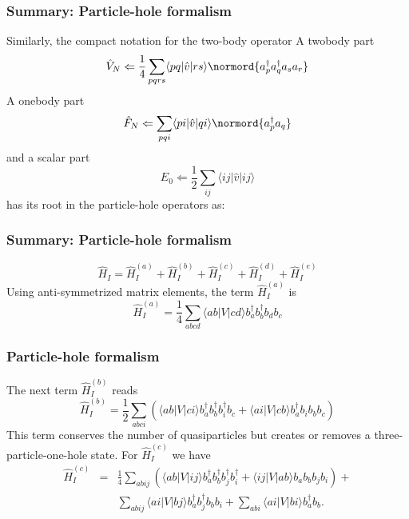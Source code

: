 \documentclass[compress]{beamer}
\newcommand*{\ket}[1]{|#1\rangle}
\newcommand*{\bra}[1]{\langle#1|}
\newcommand{\element}[3]
        {\bra{#1}#2\ket{#3}}
\begin{document}
\frame
{
  \frametitle{Summary: Particle-hole formalism}
\begin{small}
{\scriptsize
Similarly, the compact notation for the  two-body operator
    A twobody part
    \begin{equation*}
            \hat{V}_N \Leftarrow \frac{1}{4} \sum_{pqrs} \element{pq}{\hat{v}}{rs} 
                \normord{a^\dagger_p a^\dagger_q a_s  a_r}
    \end{equation*}
    A onebody part
    \begin{equation*}
            \hat{F}_N \Leftarrow \sum_{pqi} \element{pi}{\hat{v}}{qi} \normord{a^\dagger_p a_q}
    \end{equation*}
    and a scalar part
    \begin{equation*}
                E_0 \Leftarrow \frac{1}{2} \sum_{ij} \element{ij}{\hat{v}}{ij}
    \end{equation*}
has its root in the particle-hole operators as:
}
\end{small}
}



\frame
{
  \frametitle{Summary: Particle-hole formalism}
\begin{small}
{\scriptsize
\[
	\hat{H}_I = \hat{H}_I^{(a)} + \hat{H}_I^{(b)} + \hat{H}_I^{(c)} + \hat{H}_I^{(d)} + \hat{H}_I^{(e)}
\]
Using anti-symmetrized  matrix elements, 
the term  $\hat{H}_I^{(a)}$ is  
\[
	\hat{H}_I^{(a)} = \frac{1}{4}
	\sum_{abcd} \element{ab}{V}{cd} 
		b_a^\dagger b_b^\dagger b_d b_c 
\]
}
\end{small}
}


\frame
{
  \frametitle{Particle-hole formalism}
\begin{small}
{\scriptsize
The next term $\hat{H}_I^{(b)}$  reads
\[
	 \hat{H}_I^{(b)} = \frac{1}{2} \sum_{abci}\left(\element{ab}{V}{ci}b_a^\dagger b_b^\dagger b_i^\dagger b_c +\element{ai}{V}{cb}
		b_a^\dagger b_i b_b b_c\right)
\]
This term conserves the number of quasiparticles but creates or removes a 
three-particle-one-hole  state. 
For $\hat{H}_I^{(c)}$  we have
\begin{eqnarray}
	\hat{H}_I^{(c)}& =& \frac{1}{4}
		\sum_{abij}\left(\element{ab}{V}{ij}b_a^\dagger b_b^\dagger b_j^\dagger b_i^\dagger +
		\element{ij}{V}{ab}b_a  b_b b_j b_i \right)+  \nonumber \\
	&&	\sum_{abij}\element{ai}{V}{bj}b_a^\dagger b_j^\dagger b_b b_i + 
		\sum_{abi}\element{ai}{V}{bi}b_a^\dagger b_b. \nonumber
\end{eqnarray}
}
\end{small}
}
\end{document}
